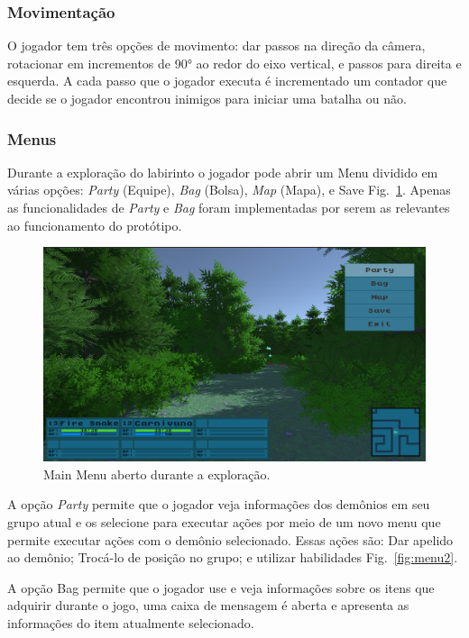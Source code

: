 \subsubsection{Movimentação}

O jogador tem três opções de movimento: dar passos na direção da câmera, rotacionar em incrementos de 90° ao redor do eixo vertical, e passos para direita e esquerda.
A cada passo que o jogador executa é incrementado um contador que decide se o jogador encontrou inimigos para iniciar uma batalha ou não.

\subsubsection{Menus}\label{owmenu}

Durante a exploração do labirinto o jogador pode abrir um Menu dividido em várias opções: \emph{Party} (Equipe), \emph{Bag} (Bolsa), \emph{Map} (Mapa), e Save Fig.~\ref{fig:menu1}. Apenas as funcionalidades de \emph{Party} e \emph{Bag} foram implementadas por serem as relevantes ao funcionamento do protótipo.

\begin{figure}[h!]
  \includegraphics[width=\linewidth]{mainmenu.jpg}
  \caption{Main Menu aberto durante a exploração.}
  \label{fig:menu1}
\end{figure}

A opção \emph{Party} permite que o jogador veja informações dos demônios em seu grupo atual e os selecione para executar ações por meio de um novo menu que permite executar ações com o demônio selecionado. Essas ações são: Dar apelido ao demônio; Trocá-lo de posição no grupo; e utilizar habilidades Fig.~\ref{fig:menu2}.

A opção Bag permite que o jogador use e veja informações sobre os itens que adquirir durante o jogo, uma caixa de mensagem é aberta e apresenta as informações do item atualmente selecionado.


